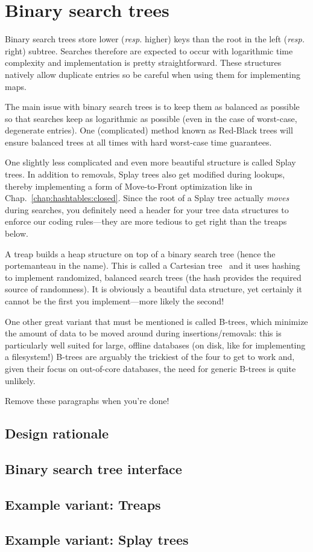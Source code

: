 \chapter{Binary search trees}\label{chap:binary:search:trees}

Binary search trees store lower (\textit{resp.} higher) keys than the root in the left (\textit{resp.} right) subtree. Searches therefore are expected to occur with logarithmic time complexity and implementation is pretty straightforward. These structures natively allow duplicate entries so be careful when using them for implementing maps.

The main issue with binary search trees is to keep them as balanced as possible so that searches keep as logarithmic as possible (even in the case of worst-case, degenerate entries). One (complicated) method known as Red-Black trees will ensure balanced trees at all times with hard worst-case time guarantees.

One slightly less complicated and even more beautiful structure is called Splay trees. In addition to removals, Splay trees also get modified during lookups, thereby implementing a form of Move-to-Front optimization like in Chap.~\ref{chap:hashtables:closed}. Since the root of a Splay tree actually \textit{moves} during searches, you definitely need a header for your tree data structures to enforce our coding rules---they are more tedious to get right than the treaps below.

A treap builds a heap structure on top of a binary search tree (hence the portemanteau in the name). This is called a Cartesian tree~\cite{ACP:treaps} and it uses hashing to implement randomized, balanced search trees (the hash provides the required source of randomness). It is obviously a beautiful data structure, yet certainly it cannot be the first you implement---more likely the second!

One other great variant that must be mentioned is called B-trees, which minimize the amount of data to be moved around during insertions/removals: this is particularly well suited for large, offline databases (on disk, like for implementing a filesystem!) B-trees are arguably the trickiest of the four to get to work and, given their focus on out-of-core databases, the need for generic B-trees is quite unlikely.

Remove these paragraphs when you're done!

\section{Design rationale}

\section{Binary search tree interface}

\section{Example variant: Treaps}

\section{Example variant: Splay trees}


